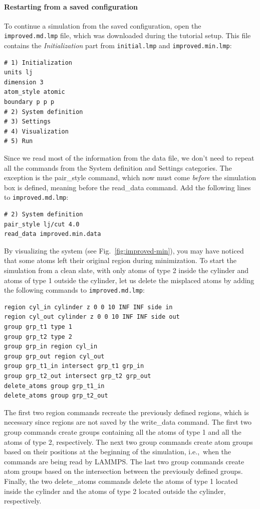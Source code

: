 \documentclass[9pt,tutorial]{livecoms}
\newcommand{\lmpcmd}[1]{\hspace{0pt}\colorbox{listing}{\textcolor{command}{\small{#1}}}\hspace{0pt}} %
\newcommand{\flecmd}[1]{\textcolor{command}{\texttt{#1}}} %
\begin{document}
\paragraph{Restarting from a saved configuration}

To continue a simulation from the saved configuration, open the
\flecmd{improved.md.lmp} file, which was downloaded during the tutorial setup.
This file contains the \textit{Initialization} part from \flecmd{initial.lmp}
and \flecmd{improved.min.lmp}:
\begin{lstlisting}
# 1) Initialization
units lj
dimension 3
atom_style atomic
boundary p p p
# 2) System definition
# 3) Settings
# 4) Visualization
# 5) Run
\end{lstlisting}
Since we read most of the information from the data file, we don't need
to repeat all the commands from the \lmpcmd{System definition}
and \lmpcmd{Settings} categories.  The exception is the \lmpcmd{pair\_style}
command, which now must come \emph{before} the simulation box is defined,
meaning before the \lmpcmd{read\_data} command.  Add the following
lines to \flecmd{improved.md.lmp}:
\begin{lstlisting}
# 2) System definition
pair_style lj/cut 4.0
read_data improved.min.data
\end{lstlisting}

By visualizing the system (see Fig.~\ref{fig:improved-min}), you may
have noticed that some atoms left their original region during
minimization.  To start the simulation from a clean slate, with only
atoms of type 2 inside the cylinder and atoms of type 1 outside the
cylinder, let us delete the misplaced atoms by adding the following
commands to \flecmd{improved.md.lmp}:

\begin{lstlisting}
region cyl_in cylinder z 0 0 10 INF INF side in
region cyl_out cylinder z 0 0 10 INF INF side out
group grp_t1 type 1
group grp_t2 type 2
group grp_in region cyl_in
group grp_out region cyl_out
group grp_t1_in intersect grp_t1 grp_in
group grp_t2_out intersect grp_t2 grp_out
delete_atoms group grp_t1_in
delete_atoms group grp_t2_out
\end{lstlisting}
The first two \lmpcmd{region} commands recreate the previously defined
regions, which is necessary since regions are not saved by the
\lmpcmd{write\_data} command.  The first two \lmpcmd{group} commands
create groups containing all the atoms of type 1 and all the
atoms of type 2, respectively.  The next two \lmpcmd{group} commands
create atom groups based on their positions at the beginning of the
simulation, i.e.,~when the commands are being read by LAMMPS.  The last
two \lmpcmd{group} commands create atom groups based on the intersection
between the previously defined groups.  Finally, the two
\lmpcmd{delete\_atoms} commands delete the atoms of type 1
located inside the cylinder and the atoms of type 2 located
outside the cylinder, respectively.
\end{document}

